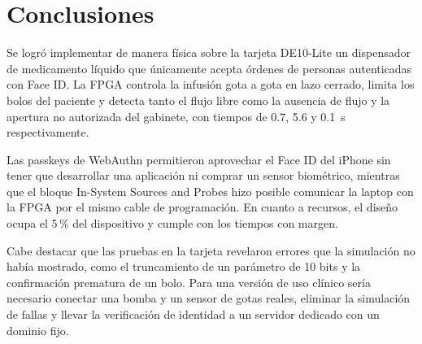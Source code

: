 \documentclass[11pt,letterpaper]{article}
\begin{document}
\section{Conclusiones}\label{sec:conclusiones}
Se logró implementar de manera física sobre la tarjeta DE10-Lite un dispensador de medicamento líquido que únicamente acepta órdenes de personas autenticadas con Face ID. La FPGA controla la infusión gota a gota en lazo cerrado, limita los bolos del paciente y detecta tanto el flujo libre como la ausencia de flujo y la apertura no autorizada del gabinete, con tiempos de 0.7, 5.6 y 0.1~s respectivamente.

Las passkeys de WebAuthn permitieron aprovechar el Face ID del iPhone sin tener que desarrollar una aplicación ni comprar un sensor biométrico, mientras que el bloque In-System Sources and Probes hizo posible comunicar la laptop con la FPGA por el mismo cable de programación. En cuanto a recursos, el diseño ocupa el 5\,\% del dispositivo y cumple con los tiempos con margen.

Cabe destacar que las pruebas en la tarjeta revelaron errores que la simulación no había mostrado, como el truncamiento de un parámetro de 10 bits y la confirmación prematura de un bolo. Para una versión de uso clínico sería necesario conectar una bomba y un sensor de gotas reales, eliminar la simulación de fallas y llevar la verificación de identidad a un servidor dedicado con un dominio fijo.
\end{document}
